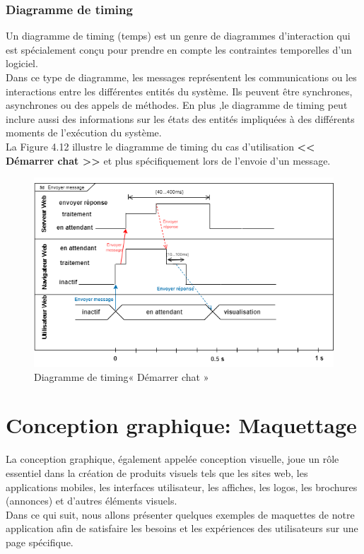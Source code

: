 \subsubsection{Diagramme de timing}
Un diagramme de timing (temps) est un genre de diagrammes d'interaction qui est spécialement conçu pour prendre en compte les contraintes temporelles d'un logiciel.\\
Dans ce type de diagramme, les messages représentent les communications ou les interactions entre les différentes entités du système. Ils peuvent être synchrones, asynchrones ou des appels de méthodes. En plus ,le diagramme de timing peut inclure aussi des informations sur les états des entités impliquées à des différents moments de l’exécution du système.\\
La Figure 4.12 illustre le diagramme de timing du cas d’utilisation \textbf{<< Démarrer chat >>} et plus spécifiquement lors de l’envoie d’un message.

\begin{figure}[H]
    \centering
    \includegraphics[width=\textwidth]{images/chp4/fig12.png}
    \caption{Diagramme de timing« Démarrer chat »}
    \label{fig:Diagramme de timing « Démarrer chat »}    
\end{figure}

\section{Conception graphique: Maquettage}
\justifying
La conception graphique, également appelée conception visuelle, joue un rôle essentiel dans la création de produits visuels tels que les sites web, les applications mobiles, les interfaces utilisateur, les affiches, les logos, les brochures (annonces) et d'autres éléments visuels.\\
Dans ce qui suit, nous allons présenter quelques exemples de maquettes de notre application afin de satisfaire les besoins et les expériences des utilisateurs sur une page spécifique.\\



